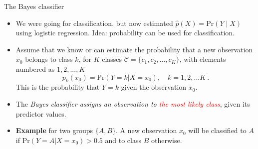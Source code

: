 \documentclass[
  10pt,
  ignorenonframetext,
]{beamer}
\providecommand{\tightlist}{%
  \setlength{\itemsep}{0pt}\setlength{\parskip}{0pt}}
\begin{document}
\begin{frame}{The Bayes classifier}
\protect\hypertarget{the-bayes-classifier}{}
\begin{itemize}
\tightlist
\item
  We were going for classification, but now estimated
  \(\hat{p}(X)=\text{Pr}(Y \mid X)\) using logistic regression. Idea:
  probability can be used for classification.
\end{itemize}

\vspace{0mm}

\begin{itemize}
\item
  Assume that we know or can estimate the probability that a new
  observation \(x_0\) belongs to class \(k\), for \(K\) classes
  \(\mathcal{C} = \{c_1, c_2,\ldots, c_K\}\), with elements numbered as
  \(1, 2, ..., K\)
  \[p_k(x_0) = \text{Pr}(Y=k | X=x_0), \quad k = 1, 2, ... K \ .\] This
  is the probability that \(Y=k\) given the observation \(x_0\).
  \vspace{1mm}
\item
  The \emph{Bayes classifier assigns an observation to
  \textcolor{red}{the most likely class}}, given its predictor values.
\item
  \textbf{Example} for two groups \(\{A, B\}\). A new observation
  \(x_0\) will be classified to \(A\) if
  \(\text{Pr}(Y=A | X=x_0) > 0.5\) and to class \(B\) otherwise.
\end{itemize}
\end{frame}
\end{document}

